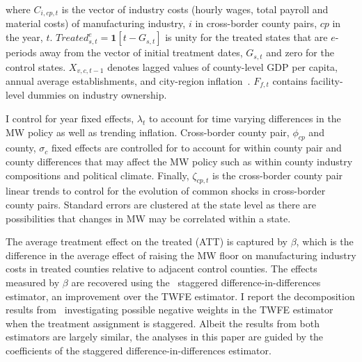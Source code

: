 \documentclass{C:/Users/david/OneDrive/Documents/ULMS/PhD/Thesis/chapter3/src/climate_change/latex/Economic_Journal/OUP-EJ}
\begin{document}
    where $C_{i,cp,t}$ is the vector of industry costs (hourly wages, total payroll and material costs) of manufacturing industry, $i$ in cross-border county pairs, $cp$ in the year, $t$. $Treated_{s,t}^e = \textbf{1}[t - G_{s,t}]$ is unity for the treated states that are $e$-periods away from the vector of initial treatment dates, $G_{s,t}$ and zero for the control states. $X_{v,c,t-1}$ denotes lagged values of county-level GDP per capita, annual average establishments, and city-region inflation~\citep{gopalan2021state, dube2010minimum, clemens2019making}. $F_{f,t}$ contains facility-level dummies on industry ownership.

    I control for year fixed effects, $\lambda_{t}$ to account for time varying differences in the MW policy as well as trending inflation. Cross-border county pair, $\phi_{cp}$ and county, $\sigma_{c}$ fixed effects are controlled for to account for within county pair and county differences that may affect the MW policy such as within county industry compositions and political climate. Finally, $\zeta_{cp,t}$ is the cross-border county pair linear trends to control for the evolution of common shocks in cross-border county pairs. Standard errors are clustered at the state level as there are possibilities that changes in MW may be correlated within a state.
    

    The average treatment effect on the treated (ATT) is captured by $\beta$, which is the difference in the average effect of raising the MW floor on manufacturing industry costs in treated counties relative to adjacent control counties. The effects measured by $\beta$ are recovered using the~\citet{sun2021estimating} staggered difference-in-differences estimator, an improvement over the TWFE estimator. I report the decomposition results from~\citet{de2020two} investigating possible negative weights in the TWFE estimator when the treatment assignment is staggered. Albeit the results from both estimators are largely similar, the analyses in this paper are guided by the coefficients of the staggered difference-in-differences estimator.
\end{document}
